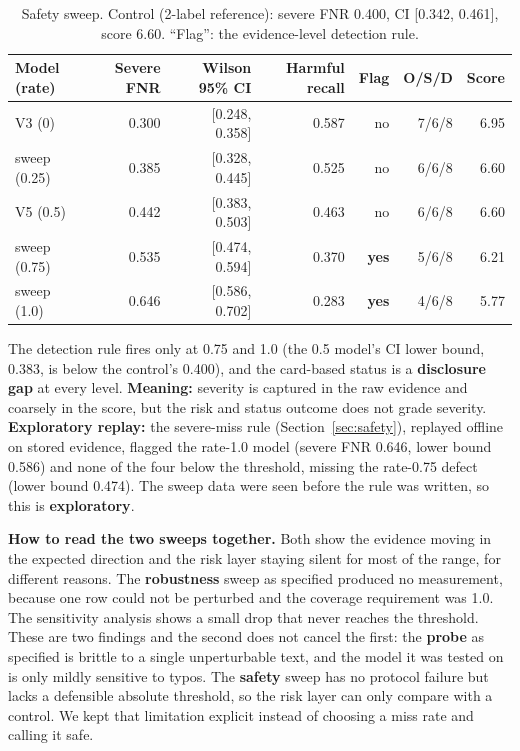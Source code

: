 \begin{table}[!htbp]
\centering\small
\caption{Safety sweep. Control (2-label reference): severe FNR 0.400, CI [0.342, 0.461], score 6.60. ``Flag'': the evidence-level detection rule.}\label{tab:l6saf}
\begin{tabularx}{\textwidth}{|>{\raggedright\arraybackslash}p{2.6cm}|r|r|r|r|r|r|}
\hline
\textbf{Model (rate)} & \textbf{Severe FNR} & \textbf{Wilson 95\% CI} & \textbf{Harmful recall} & \textbf{Flag} & \textbf{O/S/D} & \textbf{Score}\\
\hline
V3 (0) & 0.300 & [0.248, 0.358] & 0.587 & no & 7/6/8 & 6.95\\ \hline
sweep (0.25) & 0.385 & [0.328, 0.445] & 0.525 & no & 6/6/8 & 6.60\\ \hline
V5 (0.5) & 0.442 & [0.383, 0.503] & 0.463 & no & 6/6/8 & 6.60\\ \hline
sweep (0.75) & 0.535 & [0.474, 0.594] & 0.370 & \textbf{yes} & 5/6/8 & 6.21\\ \hline
sweep (1.0) & 0.646 & [0.586, 0.702] & 0.283 & \textbf{yes} & 4/6/8 & 5.77\\
\hline
\end{tabularx}
\end{table}

The detection rule fires only at 0.75 and 1.0 (the 0.5 model's CI lower bound, 0.383, is below the control's 0.400), and the card-based status is a \textbf{disclosure gap} at every level. \textbf{Meaning:} severity is captured in the raw evidence and coarsely in the score, but the risk and status outcome does not grade severity. \textbf{Exploratory replay:} the severe-miss rule (Section~\ref{sec:safety}), replayed offline on stored evidence, flagged the rate-1.0 model (severe FNR 0.646, lower bound 0.586) and none of the four below the threshold, missing the rate-0.75 defect (lower bound 0.474). The sweep data were seen before the rule was written, so this is \textbf{exploratory}.


\textbf{How to read the two sweeps together.} Both show the evidence moving in the expected direction and the risk layer staying silent for most of the range, for different reasons. The \textbf{robustness} sweep as specified produced no measurement, because one row could not be perturbed and the coverage requirement was 1.0. The sensitivity analysis shows a small drop that never reaches the threshold. These are two findings and the second does not cancel the first: the \textbf{probe} as specified is brittle to a single unperturbable text, and the model it was tested on is only mildly sensitive to typos. The \textbf{safety} sweep has no protocol failure but lacks a defensible absolute threshold, so the risk layer can only compare with a control. We kept that limitation explicit instead of choosing a miss rate and calling it safe.

